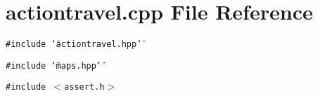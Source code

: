 \section{actiontravel.cpp File Reference}
\label{actiontravel_8cpp}
{\tt \#include \char`\"{}actiontravel.hpp\char`\"{}}\par
{\tt \#include \char`\"{}maps.hpp\char`\"{}}\par
{\tt \#include $<$assert.h$>$}\par
